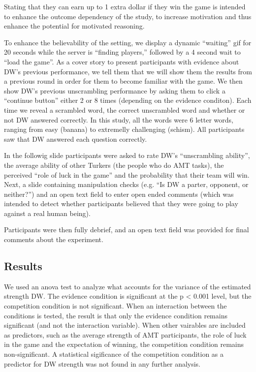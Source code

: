 \documentclass{article}
\begin{document}
Stating that they can earn up to 1 extra dollar if they win the game is intended to enhance the outcome dependency of the study, to increase motivation and thus enhance the potential for motivated reasoning. 

To enhance the believability of the setting, we display a dynamic ``waiting'' gif for 20 seconds while the server is ``finding players,'' followed by a 4 second wait to ``load the game''. As a cover story to present participants with evidence about DW's previous performance, we tell them that we will show them the results from a previous round in order for them to become familiar with the game. We then show DW's previous unscrambling performance by asking them to click a ``continue button'' either 2 or 8 times (depending on the evidence conditon). Each time we reveal a scrambled word, the correct unscrambled word and whether or not DW answered correctly. In this study, all the words were 6 letter words, ranging from easy (banana) to extremelly challenging (schism). All participants saw that DW answered each question correctly.

In the followig slide participants were asked to rate DW's ``unscrambling ability'', the average ability of other Turkers (the people who do AMT tasks), the perceived ``role of luck in the game'' and the probability that their team will win. Next, a slide containing manipulation checks (e.g. ``Is DW a parter, opponent, or neither?'') and an open text field to enter open ended comments (which was intended to detect whether participants believed that they were going to play against a real human being).


Participants were then fully debrief, and an open text field was provided for final comments about the experiment. 




\subsection{Results}


We used an anova test to analyze what accounts for the variance of the estimated strength DW. The evidence condition is significant at the p < 0.001 level, but the competition condition is not significant. When an interaction between the conditions is tested, the result is that only the evidence condition remains significant (and not the interaction variable). When other vairables are included as predictors, such as the average strength of AMT participants, the role of luck in the game and the expectation of winning, the competition condition remains non-significant. A statistical sigificance of the competition condition as a predictor for DW strength was not found in any further analysis.
\end{document}
